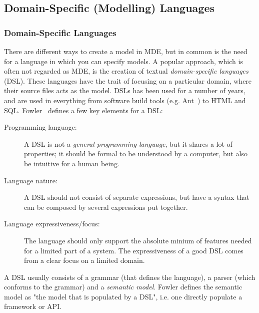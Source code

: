 \subsection{Domain-Specific (Modelling) Languages}\label{subsec:dsml}
\subsubsection{Domain-Specific Languages}
There are different ways to create a model in MDE, but in common is the need for a language in which you can specify models. A popular approach, which is often not regarded as MDE, is the creation of textual \emph{domain-specific languages} (DSL). These languages have the trait of focusing on a particular domain, where their source files acts as the model. DSLs has been used for a number of years, and are used in everything from software build tools (e.g. Ant~\cite{apache_ant}) to HTML and SQL.
Fowler~\cite{fowler2010domain} defines a few key elements for a DSL:
\begin{description}
  \item[Programming language:] A DSL is not a \emph{general programming language}, but it shares a lot of properties; it should be formal to be understood by a computer, but also be intuitive for a human being.
  \item[Language nature:] A DSL should not consist of separate expressions, but have a syntax that can be composed by several expressions put together.
  \item[Language expressiveness/focus:] The language should only support the absolute minium of features needed for a limited part of a system. The expressiveness of a good DSL comes from a clear focus on a limited domain.
\end{description}

A DSL usually consists of a grammar (that defines the language), a parser (which conforms to the grammar) and a \emph{semantic model}. Fowler defines the semantic model as "the model that is populated by a DSL", i.e. one directly populate a framework or API.\newline

